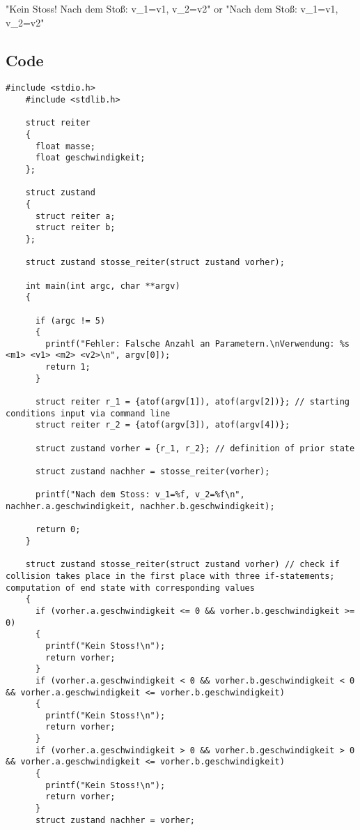 \documentclass[12pt,a4paper]{article}
\begin{document}
\vspace{1cm}

"Kein Stoss!
Nach dem Stoß: v\_1=v1, v\_2=v2"
\newline
or 
\newline
"Nach dem Stoß: v\_1=v1,  v\_2=v2"

\vspace{8cm}

\subsection{Code}
\begin{lstlisting}[caption={Elastic Collision},label={lst:p7001}]
    #include <stdio.h>
    #include <stdlib.h>
    
    struct reiter
    {
      float masse;
      float geschwindigkeit;
    };
    
    struct zustand
    {
      struct reiter a;
      struct reiter b;
    };
    
    struct zustand stosse_reiter(struct zustand vorher);
    
    int main(int argc, char **argv)
    {
    
      if (argc != 5)
      {
        printf("Fehler: Falsche Anzahl an Parametern.\nVerwendung: %s <m1> <v1> <m2> <v2>\n", argv[0]);
        return 1;
      }
    
      struct reiter r_1 = {atof(argv[1]), atof(argv[2])}; // starting conditions input via command line
      struct reiter r_2 = {atof(argv[3]), atof(argv[4])};
    
      struct zustand vorher = {r_1, r_2}; // definition of prior state 
    
      struct zustand nachher = stosse_reiter(vorher);

      printf("Nach dem Stoss: v_1=%f, v_2=%f\n", nachher.a.geschwindigkeit, nachher.b.geschwindigkeit);

      return 0;
    }
    
    struct zustand stosse_reiter(struct zustand vorher) // check if collision takes place in the first place with three if-statements; computation of end state with corresponding values
    {
      if (vorher.a.geschwindigkeit <= 0 && vorher.b.geschwindigkeit >= 0)
      {
        printf("Kein Stoss!\n");
        return vorher;
      }
      if (vorher.a.geschwindigkeit < 0 && vorher.b.geschwindigkeit < 0 && vorher.a.geschwindigkeit <= vorher.b.geschwindigkeit)
      {
        printf("Kein Stoss!\n");
        return vorher;
      }
      if (vorher.a.geschwindigkeit > 0 && vorher.b.geschwindigkeit > 0 && vorher.a.geschwindigkeit <= vorher.b.geschwindigkeit)
      {
        printf("Kein Stoss!\n");
        return vorher;
      }
      struct zustand nachher = vorher;
    

\end{lstlisting}
\end{document}
